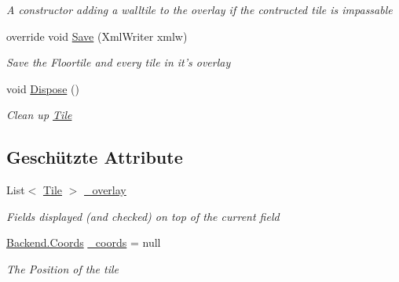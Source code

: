 \begin{DoxyCompactItemize}
\begin{DoxyCompactList}\small\item\em A constructor adding a walltile to the overlay if the contructed tile is impassable \end{DoxyCompactList}\item 
override void \hyperlink{class_gruppe22_1_1_backend_1_1_floor_tile_a4a096b8d6ff25557bd807751268987f2}{Save} (Xml\-Writer xmlw)
\begin{DoxyCompactList}\small\item\em Save the Floortile and every tile in it's overlay \end{DoxyCompactList}\item 
void \hyperlink{class_gruppe22_1_1_backend_1_1_floor_tile_a37dbc28f0467127f30aaddf709975c70}{Dispose} ()
\begin{DoxyCompactList}\small\item\em Clean up \hyperlink{class_gruppe22_1_1_backend_1_1_tile}{Tile} \end{DoxyCompactList}\end{DoxyCompactItemize}
\subsection*{Geschützte Attribute}
\begin{DoxyCompactItemize}
\item 
List$<$ \hyperlink{class_gruppe22_1_1_backend_1_1_tile}{Tile} $>$ \hyperlink{class_gruppe22_1_1_backend_1_1_floor_tile_ac860f59975d901d76d45681acf9d61f4}{\-\_\-overlay}
\begin{DoxyCompactList}\small\item\em Fields displayed (and checked) on top of the current field \end{DoxyCompactList}\item 
\hyperlink{class_gruppe22_1_1_backend_1_1_coords}{Backend.\-Coords} \hyperlink{class_gruppe22_1_1_backend_1_1_floor_tile_a192eaa6b557b27ddebe7a16ea38d13e5}{\-\_\-coords} = null
\begin{DoxyCompactList}\small\item\em The Position of the tile \end{DoxyCompactList}\end{DoxyCompactItemize}
